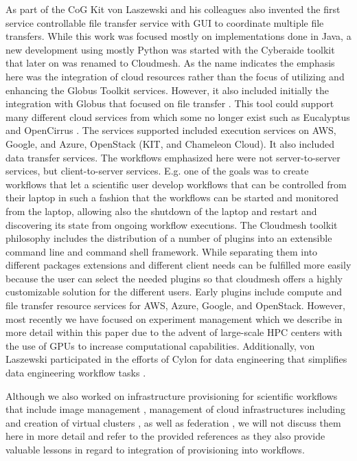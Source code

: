 \documentclass[utf8]{FrontiersinVancouver} %
\begin{document}
As part of the CoG Kit von Laszewski and his colleagues also invented the first service controllable file transfer service with GUI to coordinate multiple file transfers. While this work was focused mostly on implementations done in Java, a new development using mostly Python was started with the Cyberaide toolkit \citep{las-09-ccgrid} that later on was renamed to Cloudmesh. As the name indicates the emphasis here was the integration of cloud resources rather than the focus of utilizing and enhancing the Globus Toolkit services. However, it also included initially the integration with Globus that focused on file transfer 
\citep{las-04-ftp-journal}
\citep{las-03-ftp}.
This tool could support many different cloud services from which some no longer exist such as Eucalyptus \cite{eucalyptus} and OpenCirrus \cite{opencirrus}. The services supported included execution services on AWS, Google, and Azure, OpenStack (KIT, and Chameleon Cloud). It also included data transfer services. The workflows emphasized here were not server-to-server services, but client-to-server services. E.g. one of the goals was to create workflows that let a scientific user develop workflows that can be controlled from their laptop in such a fashion that the workflows can be started and monitored from the laptop, allowing also the shutdown of the laptop and restart and discovering its state from ongoing workflow executions. 
The Cloudmesh toolkit \citep{las-17-cloudmesh} philosophy includes the distribution of a number of plugins into an extensible command line and command shell framework. While separating them into different packages extensions and different client needs can be fulfilled more easily because the user can select the needed plugins so that cloudmesh offers a highly customizable solution for the different users. Early plugins include compute and file transfer resource services for AWS, Azure, Google, and OpenStack. However, most recently we have focused on experiment management which we describe in more detail within this paper due to the advent of large-scale HPC centers with the use of GPUs to increase computational capabilities. 
Additionally, von Laszewski participated in the efforts of Cylon for data engineering that simplifies data engineering workflow tasks \citep{cylon,cylon-radical}. 

Although we also worked on infrastructure provisioning for scientific
workflows that include image management
\citep{las-12-imagemanagement}, management of cloud infrastructures
including \citep{las-20-10gce,las-14-bigdata,las-12-fg-bookchapter}
\citep{las-17-futuregrid} and creation of virtual clusters
\citep{las-16-virtcluster,las-19-harc-comet}, as well as federation
\citep{las-08-federated-cloud}, we will not discuss them here in more
detail and refer to the provided references as they also provide
valuable lessons in regard to integration of provisioning into
workflows.
\end{document}
